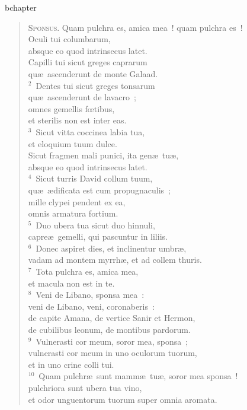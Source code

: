 bchapter\begin{verse}\vspace{-19pt}\textsc{Sponsus.} Quam pulchra es, amica mea~! quam pulchra es~!\\ Oculi tui columbarum,\\ absque eo quod intrinsecus latet.\\ Capilli tui sicut greges caprarum\\ qu\ae\ ascenderunt de monte Galaad.\\
${}^{2}$~Dentes tui sicut greges tonsarum\\ qu\ae\ ascenderunt de lavacro~;\\ omnes gemellis fœtibus,\\ et sterilis non est inter eas.\\
${}^{3}$~Sicut vitta coccinea labia tua,\\ et eloquium tuum dulce.\\ Sicut fragmen mali punici, ita gen\ae\ tu\ae ,\\ absque eo quod intrinsecus latet.\\
${}^{4}$~Sicut turris David collum tuum,\\ qu\ae\ \ae dificata est cum propugnaculis~;\\ mille clypei pendent ex ea,\\ omnis armatura fortium.\\
${}^{5}$~Duo ubera tua sicut duo hinnuli,\\ capre\ae\ gemelli, qui pascuntur in liliis.\\
${}^{6}$~Donec aspiret dies, et inclinentur umbr\ae ,\\ vadam ad montem myrrh\ae , et ad collem thuris.\\
${}^{7}$~Tota pulchra es, amica mea,\\ et macula non est in te.\\
${}^{8}$~Veni de Libano, sponsa mea~:\\ veni de Libano, veni, coronaberis~:\\ de capite Amana, de vertice Sanir et Hermon,\\ de cubilibus leonum, de montibus pardorum.\\
${}^{9}$~Vulnerasti cor meum, soror mea, sponsa~;\\ vulnerasti cor meum in uno oculorum tuorum,\\ et in uno crine colli tui.\\
${}^{10}$~Quam pulchr\ae\ sunt mamm\ae\ tu\ae , soror mea sponsa~!\\ pulchriora sunt ubera tua vino,\\ et odor unguentorum tuorum super omnia aromata.\\

\end{verse}
